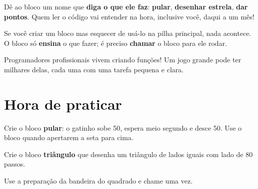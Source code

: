 \begin{dica}
Dê ao bloco um nome que \textbf{diga o que ele faz}: \textbf{pular}, \textbf{desenhar estrela}, \textbf{dar pontos}. Quem ler o código vai entender na hora, inclusive você, daqui a um mês!
\end{dica}

\begin{cuidado}
Se você criar um bloco mas esquecer de usá-lo na pilha principal, nada acontece. O bloco  só \textbf{ensina} o que fazer; é preciso \textbf{chamar} o bloco para ele rodar.
\end{cuidado}

\begin{curiosidade}
Programadores profissionais vivem criando funções! Um jogo grande pode ter milhares delas, cada uma com uma tarefa pequena e clara.
\end{curiosidade}

\section{Hora de praticar}

\begin{exercicio}
Crie o bloco \textbf{pular}: o gatinho sobe 50, espera meio segundo e desce 50. Use o bloco quando apertarem a seta para cima.
\end{exercicio}

\begin{solucao}
\begin{pilha}
\end{pilha}
\begin{pilha}
\end{pilha}
\end{solucao}

\begin{exercicio}
Crie o bloco \textbf{triângulo} que desenha um triângulo de lados iguais com lado de 80 passos.
\end{exercicio}

\begin{solucao}
Use a preparação da bandeira do quadrado e chame  uma vez.
\begin{pilha}
\sbcend
{}
\end{pilha}
\end{solucao}

